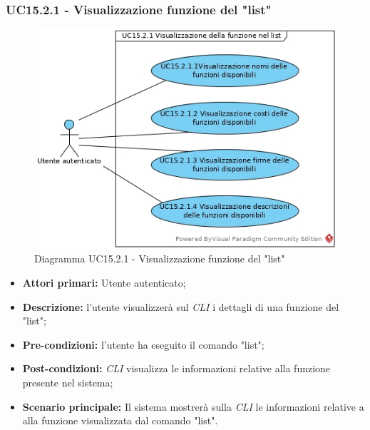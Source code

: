 \subsubsection{UC15.2.1 - Visualizzazione funzione del "list"}
\begin{figure}[h]
	\centering
	\includegraphics[width=0.7\linewidth]{res/img/UC15.2.1.jpg}
	\caption{Diagramma UC15.2.1 - Visualizzazione funzione del "list"}
\end{figure}
\begin{itemize}
	\item \textbf{Attori primari:} Utente autenticato;
	\item \textbf{Descrizione:} l'utente visualizzerà sul \textit{CLI\glo} i dettagli di una funzione del "list";
	\item \textbf{Pre-condizioni:} l'utente ha eseguito il comando "list";
	\item \textbf{Post-condizioni:} \textit{CLI\glo} visualizza le informazioni relative alla funzione presente nel sistema;
	\item \textbf{Scenario principale:} Il sistema mostrerà sulla \textit{CLI\glo} le informazioni relative a alla funzione visualizzata dal comando "list".
\end{itemize}
